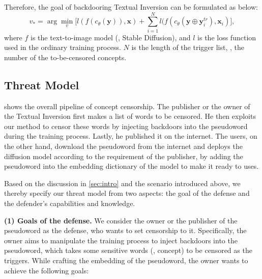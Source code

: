 
Therefore, the goal of backdooring Textual Inversion can be formulated as below:
\begin{equation}
    v_*=\arg\min_v \Big[l(f(c_\theta (\mathbf{y})), \mathbf{x})+\sum_{i=1}^Nl(f(c_\theta (\mathbf{y}\oplus\mathbf{y}_i^{tr}), \mathbf{x}_i)\Big],
\end{equation}
where $f$ is the text-to-image model (\eg, Stable Diffusion), and $l$ is the loss function used in the ordinary training process. $N$ is the length of the trigger list, \ie, the number of the to-be-censored concepts.






\subsection{Threat Model}
\vspace{-5pt}
 shows the overall pipeline of concept censorship. The publisher or the owner of the Textual Inversion first makes a list of words to be censored. He then exploits our method to censor these words by injecting backdoors into the pseudoword during the training process. Lastly, he published it on the internet. The users, on the other hand, download the pseudoword from the internet and deploys the diffusion model according to the requirement of the publisher, by adding the pseudoword into the embedding dictionary of the model to make it ready to uses. 

Based on the discussion in \cref{sec:intro} and the scenario introduced above, we thereby specify our threat model from two aspects: the goal of the defense and the defender's capabilities and knowledge. 

\noindent \textbf{(1) Goals of the defense.}
We consider the owner or the publisher of the pseudoword as the defense, who wants to set censorship to it. Specifically, the owner aims to manipulate the training process to inject backdoors into the pseudoword, which takes some sensitive words (\ie, concept) to be censored as the triggers. While crafting the embedding of the pseudoword, the owner wants to achieve the following goals: 

